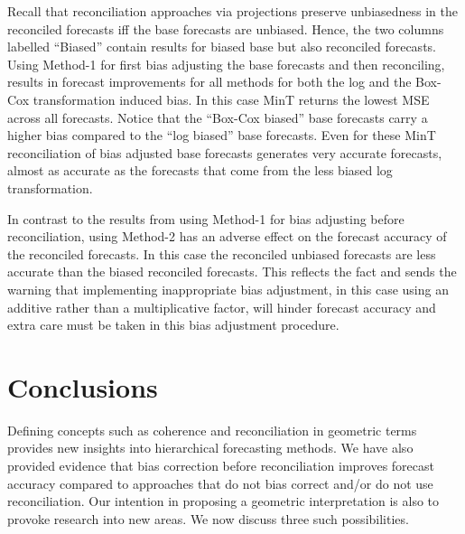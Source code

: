 \documentclass[12pt]{article}
\theoremstyle{definition}
\begin{document}
Recall that reconciliation approaches via projections preserve unbiasedness in the reconciled forecasts iff the base forecasts are unbiased. Hence, the two columns labelled ``Biased'' contain results for biased base but also reconciled forecasts. Using Method-1 for first bias adjusting the base forecasts and then reconciling, results in forecast improvements for all methods for both the log and the Box-Cox transformation induced bias. In this case MinT returns the lowest MSE across all forecasts. Notice that the ``Box-Cox biased'' base forecasts carry a higher bias compared to the ``log biased'' base forecasts. Even for these MinT reconciliation of bias adjusted base forecasts generates very accurate forecasts, almost as accurate as the forecasts that come from the less biased log transformation.

In contrast to the results from using Method-1 for bias adjusting before reconciliation, using Method-2 has an adverse effect on the forecast accuracy of the reconciled forecasts. In this case the reconciled unbiased forecasts are less accurate than the biased reconciled forecasts. This reflects the fact and sends the warning that implementing inappropriate bias adjustment, in this case using an additive rather than a multiplicative factor, will hinder forecast accuracy and extra care must be taken in this bias adjustment procedure.

\section{Conclusions}\label{sec:conclusions}


Defining concepts such as coherence and reconciliation in geometric terms provides new insights into hierarchical forecasting methods. We have also provided evidence that bias correction before reconciliation improves forecast accuracy compared to approaches that do not bias correct and/or do not use reconciliation. Our intention in proposing a geometric interpretation is also to provoke research into new areas. We now discuss three such possibilities.
\end{document}
